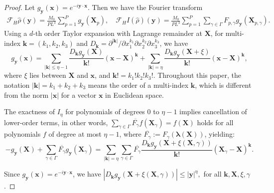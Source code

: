 \documentclass[review,onefignum,onetabnum]{siamart250211}
\begin{document}
\begin{proof}
Let \( g_\mathbf{y}(\mathbf{x}) = e^{-i\mathbf{y} \cdot \mathbf{x}} \). Then we have the Fourier transform 
\begin{equation}
\begin{aligned}
\label{eq:FH}
\mathcal{F}_H \hat{\rho}(\mathbf{y}) = \frac{M_0}{PL^3} \sum_{p=1}^{P} g_\mathbf{y}(\mathbf{X}_p),\quad
\mathcal{F}_H I(\hat{\rho})(\mathbf{y}) = \frac{M_0}{PL^3} \sum_{p=1}^{P} \sum_{\gamma \in \Gamma} F_{p,\gamma} g_\mathbf{y}(\mathbf{X}_{p, \gamma}).
\end{aligned}
\end{equation}
 Using a \(d\)-th order Taylor expansion with Lagrange remainder at \(\mathbf{X}\), for multi-index \(\mathbf{k} = (k_1, k_2, k_3)\) and \(D_{\mathbf{k}} = \partial^{|\mathbf{k}|}/\partial x_1^{k_1} \partial x_2^{k_2} \partial x_3^{k_3}\), we have
\begin{equation}
g_\mathbf{y}(\mathbf{x}) = \sum_{|\mathbf{k}| \leq \eta-1} \frac{D_{\mathbf{k}} g_\mathbf{y}(\mathbf{X})}{\mathbf{k}!} (\mathbf{x} - \mathbf{X})^{\mathbf{k}} + \sum_{|\mathbf{k}| = \eta} \frac{D_{\mathbf{k}} g_\mathbf{y}(\mathbf{X} + \xi)}{\mathbf{k}!} (\mathbf{x} - \mathbf{X})^{\mathbf{k}},
\end{equation}
where \(\xi\) lies between \(\mathbf{X}\) and \(\mathbf{x}\), and \(\mathbf{k}! = k_1! k_2! k_3!\).
Throughout this paper, the notation $|\mathbf{k}|=k_1+k_2+k_3$ means the order of a multi-index $\mathbf{k}$, which is different from the norm $|\mathbf{x}|$ for a vector $\mathbf{x}$ in Euclidean space.

The exactness of \(I_\eta\) for polynomials of degrees \(0\) to \( \eta-1\) implies cancellation of lower-order terms, in other words,
\(
\sum_{\gamma \in \Gamma} \overline{F_{\gamma}} f(\mathbf{X}_\gamma) = f(\mathbf{X})
\)
holds for all polynomials \( f \) of degree at most \( \eta-1 \), where $\overline{F_{\gamma}}:=F_{\gamma}(\boldsymbol{\lambda}(\mathbf{X}))$, yielding: 
\begin{equation}
-g_\mathbf{y}(\mathbf{X}) + \sum_{\gamma \in \Gamma} \overline{F_{\gamma}} g_\mathbf{y}(\mathbf{X}_\gamma) = \sum_{|\mathbf{k}| = \eta} \sum_{\gamma \in \Gamma} \overline{F_{\gamma}} \frac{D_{\mathbf{k}} g_\mathbf{y}(\mathbf{X} + \xi(\mathbf{X}, \gamma))}{\mathbf{k}!} (\mathbf{X}_\gamma - \mathbf{X})^{\mathbf{k}}.
\end{equation}

Since \( g_\mathbf{y}(\mathbf{x}) = e^{-i\mathbf{y} \cdot \mathbf{x}} \), we have 
\(
|D_{\mathbf{k}} g_\mathbf{y}(\mathbf{X} + \xi(\mathbf{X}, \gamma))| \leq |\mathbf{y}|^\eta,
\)
for all \(\mathbf{k},\mathbf{X},\xi, \gamma\).


\end{proof}
\end{document}
